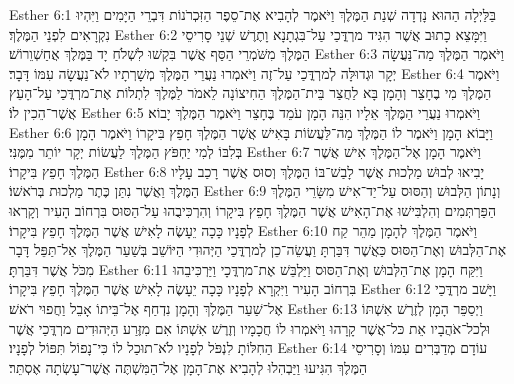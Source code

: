 Esther 6:1	בַּלַּיְלָה הַהוּא נָדְדָה שְׁנַת הַמֶּלֶךְ וַיֹּאמֶר לְהָבִיא אֶת־סֵפֶר הַזִּכְרֹנוֹת דִּבְרֵי הַיָּמִים וַיִּהְיוּ נִקְרָאִים לִפְנֵי הַמֶּלֶךְ׃
Esther 6:2	וַיִּמָּצֵא כָתוּב אֲשֶׁר הִגִּיד מרְדֳּכַי עַל־בִּגְתָנָא וָתֶרֶשׁ שְׁנֵי סָרִיסֵי הַמֶּלֶךְ מִשֹּׁמְרֵי הַסַּף אֲשֶׁר בִּקְשׁוּ לִשְׁלֹחַ יָד בַּמֶּלֶךְ אֲחַשְׁוֵרוֹשׁ׃
Esther 6:3	וַיֹּאמֶר הַמֶּלֶךְ מַה־נַּעֲשָׂה יְקָר וּגְדוּלָּה לְמרְדֳּכַי עַל־זֶה וַיֹּאמְרוּ נַעֲרֵי הַמֶּלֶךְ מְשָׁרְתָיו לֹא־נַעֲשָׂה עִמּוֹ דָּבָר׃
Esther 6:4	וַיֹּאמֶר הַמֶּלֶךְ מִי בֶחָצֵר וְהָמָן בָּא לַחֲצַר בֵּית־הַמֶּלֶךְ הַחִיצוֹנָה לֵאמֹר לַמֶּלֶךְ לִתְלוֹת אֶת־מרְדֳּכַי עַל־הָעֵץ אֲשֶׁר־הֵכִין לוֹ׃
Esther 6:5	וַיֹּאמְרוּ נַעֲרֵי הַמֶּלֶךְ אֵלָיו הִנֵּה הָמָן עֹמֵד בֶּחָצֵר וַיֹּאמֶר הַמֶּלֶךְ יָבוֹא׃
Esther 6:6	וַיָּבוֹא הָמָן וַיֹּאמֶר לוֹ הַמֶּלֶךְ מַה־לַּעֲשׂוֹת בָּאִישׁ אֲשֶׁר הַמֶּלֶךְ חָפֵץ בִּיקָרוֹ וַיֹּאמֶר הָמָן בְּלִבּוֹ לְמִי יַחְפֹּץ הַמֶּלֶךְ לַעֲשׂוֹת יְקָר יוֹתֵר מִמֶּנִּי׃
Esther 6:7	וַיֹּאמֶר הָמָן אֶל־הַמֶּלֶךְ אִישׁ אֲשֶׁר הַמֶּלֶךְ חָפֵץ בִּיקָרוֹ׃
Esther 6:8	יָבִיאוּ לְבוּשׁ מַלְכוּת אֲשֶׁר לָבַשׁ־בּוֹ הַמֶּלֶךְ וְסוּס אֲשֶׁר רָכַב עָלָיו הַמֶּלֶךְ וַאֲשֶׁר נִתַּן כֶּתֶר מַלְכוּת בְּרֹאשׁוֹ׃
Esther 6:9	וְנָתוֹן הַלְּבוּשׁ וְהַסּוּס עַל־יַד־אִישׁ מִשָּׂרֵי הַמֶּלֶךְ הַפַּרְתְּמִים וְהִלְבִּישׁוּ אֶת־הָאִישׁ אֲשֶׁר הַמֶּלֶךְ חָפֵץ בִּיקָרוֹ וְהִרְכִּיבֻהוּ עַל־הַסּוּס בִּרְחוֹב הָעִיר וְקָרְאוּ לְפָנָיו כָּכָה יֵעָשֶׂה לָאִישׁ אֲשֶׁר הַמֶּלֶךְ חָפֵץ בִּיקָרוֹ׃
Esther 6:10	וַיֹּאמֶר הַמֶּלֶךְ לְהָמָן מַהֵר קַח אֶת־הַלְּבוּשׁ וְאֶת־הַסּוּס כַּאֲשֶׁר דִּבַּרְתָּ וַעֲשֵׂה־כֵן לְמרְדֳּכַי הַיְּהוּדִי הַיּוֹשֵׁב בְּשַׁעַר הַמֶּלֶךְ אַל־תַּפֵּל דָּבָר מִכֹּל אֲשֶׁר דִּבַּרְתָּ׃
Esther 6:11	וַיִּקַּח הָמָן אֶת־הַלְּבוּשׁ וְאֶת־הַסּוּס וַיַּלְבֵּשׁ אֶת־מרְדֳּכָי וַיַּרְכִּיבֵהוּ בִּרְחוֹב הָעִיר וַיִּקְרָא לְפָנָיו כָּכָה יֵעָשֶׂה לָאִישׁ אֲשֶׁר הַמֶּלֶךְ חָפֵץ בִּיקָרוֹ׃
Esther 6:12	וַיָּשׁב מרְדֳּכַי אֶל־שַׁעַר הַמֶּלֶךְ וְהָמָן נִדְחַף אֶל־בֵּיתוֹ אָבֵל וַחֲפוּי רֹאשׁ׃
Esther 6:13	וַיְסַפֵּר הָמָן לְזֶרֶשׁ אִשְׁתּוֹ וּלְכל־אֹהֲבָיו אֵת כּל־אֲשֶׁר קָרָהוּ וַיֹּאמְרוּ לוֹ חֲכָמָיו וְזֶרֶשׁ אִשְׁתּוֹ אִם מִזֶּרַע הַיְּהוּדִים מרְדֳּכַי אֲשֶׁר הַחִלּוֹתָ לִנְפֹּל לְפָנָיו לֹא־תוּכַל לוֹ כִּי־נָפוֹל תִּפּוֹל לְפָנָיו׃
Esther 6:14	עוֹדָם מְדַבְּרִים עִמּוֹ וְסָרִיסֵי הַמֶּלֶךְ הִגִּיעוּ וַיַּבְהִלוּ לְהָבִיא אֶת־הָמָן אֶל־הַמִּשְׁתֶּה אֲשֶׁר־עָשְׂתָה אֶסְתֵּר׃
